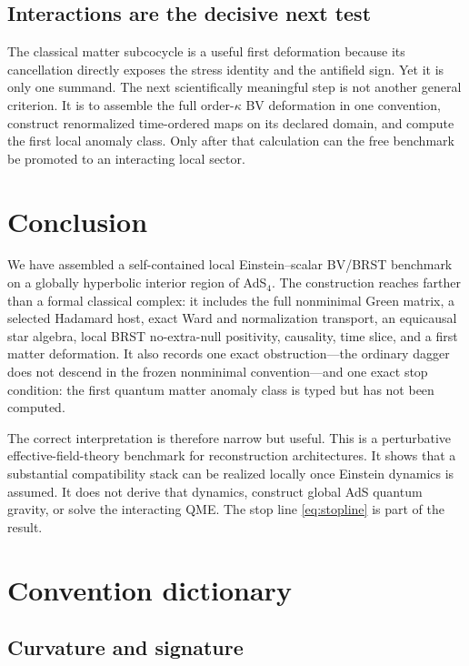 \documentclass[11pt]{article}
\theoremstyle{definition}
\theoremstyle{remark}
\begin{document}
\subsection{Interactions are the decisive next test}

The classical matter subcocycle is a useful first deformation because its cancellation
directly exposes the stress identity and the antifield sign.  Yet it is only one
summand.  The next scientifically meaningful step is not another general criterion.
It is to assemble the full order-$\kappa$ BV deformation in one convention, construct
renormalized time-ordered maps on its declared domain, and compute the first local
anomaly class.  Only after that calculation can the free benchmark be promoted to an
interacting local sector.

\section{Conclusion}

We have assembled a self-contained local Einstein--scalar BV/BRST benchmark on a
globally hyperbolic interior region of AdS$_4$.  The construction reaches farther than
a formal classical complex: it includes the full nonminimal Green matrix, a selected
Hadamard host, exact Ward and normalization transport, an equicausal star algebra,
local BRST no-extra-null positivity, causality, time slice, and a first matter
deformation.  It also records one exact obstruction---the ordinary dagger does not
descend in the frozen nonminimal convention---and one exact stop condition: the first
quantum matter anomaly class is typed but has not been computed.

The correct interpretation is therefore narrow but useful.  This is a perturbative
effective-field-theory benchmark for reconstruction architectures.  It shows that a
substantial compatibility stack can be realized locally once Einstein dynamics is
assumed.  It does not derive that dynamics, construct global AdS quantum gravity, or
solve the interacting QME.  The stop line \cref{eq:stopline} is part of the result.

\appendix

\section{Convention dictionary}

\subsection{Curvature and signature}
\end{document}
